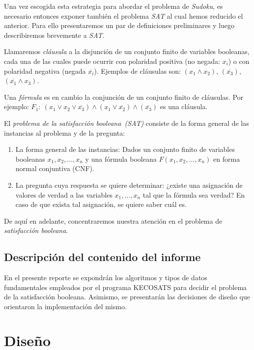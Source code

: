 \documentclass[12pt,lettersize,oneside]{article}
\begin{document}
Una vez escogida esta estrategia para abordar el problema de \emph{Sudoku}, es
necesario entonces exponer también el problema \emph{SAT} al cual hemos
reducido el anterior. Para ello presentaremos un par de definiciones
preliminares y luego describiremos brevemente a \emph{SAT}.

 Llamaremos \emph{cláusula} a la disjunción de un conjunto finito de
variables booleanas, cada una de las cuales puede ocurrir con polaridad positiva
(no negada: $x_i$) o con polaridad negativa (negada $\overline{x_i}$).  Ejemplos
de cláusulas son: $(x_1 \wedge x_2)$, $(\overline{x_3})$, $(\overline{x_1}
\wedge x_3)$.

Una \emph{fórmula} es en cambio la conjunción de un conjunto finito de
cláusulas. Por ejemplo: $F_1:\ (x_1 \vee x_2 \vee \overline{x_3}) \wedge (x_1
\vee \overline{x_2}) \wedge (\overline{x_3})$ es una cláusula.

El \emph{problema de la satisfacción booleana~(SAT)} consiste de la
forma general de las instancias al problema y de la pregunta: \vspace{-2.5mm}
\begin{enumerate}
\item La forma general de las instancias: Dados un conjunto finito de variables
  booleanas $x_1,x_2,\ldots,x_n$ y una fórmula booleana $F(x_1,x_2,\ldots,x_n)$
  en forma normal conjuntiva (CNF).
\item La pregunta cuya respuesta se quiere determinar: ¿existe una asignación de
  valores de verdad a las variables $x_1,\ldots, x_n$ tal que la fórmula sea
  verdad? En caso de que exista tal asignación, se quiere saber cuál es.
\end{enumerate}

De aquí en adelante, concentraremos nuestra atención en el problema de
\emph{satisfacción booleana}.

\subsection{Descripción del contenido del informe}
En el presente reporte se expondrán los algoritmos y tipos de datos
fundamentales empleados por el programa KECOSATS para decidir el problema de la
satisfacción booleana. Asimismo, se presentarán las decisiones de diseño que
orientaron la implementación del mismo.

\section{Diseño}
\end{document}
